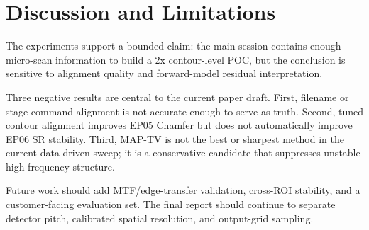 \section{Discussion and Limitations}

The experiments support a bounded claim: the main session contains enough
micro-scan information to build a 2x contour-level POC, but the conclusion is
sensitive to alignment quality and forward-model residual interpretation.

Three negative results are central to the current paper draft. First, filename
or stage-command alignment is not accurate enough to serve as truth. Second,
tuned contour alignment improves EP05 Chamfer but does not automatically
improve EP06 SR stability. Third, MAP-TV is not the best or sharpest method in
the current data-driven sweep; it is a conservative candidate that suppresses
unstable high-frequency structure.

Future work should add MTF/edge-transfer validation, cross-ROI stability, and a
customer-facing evaluation set. The final report should continue to separate
detector pitch, calibrated spatial resolution, and output-grid sampling.

